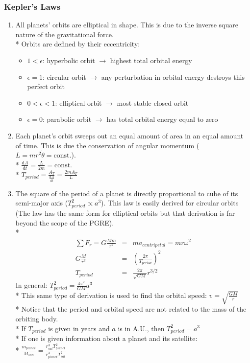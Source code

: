 \subsubsection{Kepler's Laws}
\begin{enumerate}
\item All planets' orbits are elliptical in shape. This is due to the inverse square nature of the gravitational force.\\*
Orbits are defined by their eccentricity:
\begin{itemize}
\item \(1<\epsilon\): hyperbolic orbit \(\to\) highest total orbital energy
\item \(\epsilon =1\): circular orbit \(\to\) any perturbation in orbital energy destroys this perfect orbit
\item  \(0<\epsilon < 1\): elliptical orbit \(\to\) most stable closed orbit
\item \(\epsilon = 0\): parabolic orbit \(\to\) has total orbital energy equal to zero
\end{itemize}
\item Each planet's orbit sweeps out an equal amount of area in an equal amount of time. This is due the conservation of angular momentum (\(L=mr^2\dot{\theta}=\mathrm{const.}\)).\\*
\(\frac{\mathrm{d}A}{\mathrm{d}t}=\frac{L}{2m}=\mathrm{const.}\)\\*
\(T_{period}=\frac{A_T}{\frac{\mathrm{d}A}{\mathrm{d}t}}=\frac{2mA_T}{L}\)
\item The square of the period of a planet is directly proportional to cube of its semi-major axis (\( T_{period}^2 \propto a^3\)). This law is easily derived for circular orbits (The law has the same form for elliptical orbits but that derivation is far beyond the scope of the PGRE).\\*
\begin{eqnarray}
\displaystyle\sum F_r=G\frac{Mm}{r^2}&=&ma_{centripetal}=mr\omega^2 \nonumber \\
G\frac{M}{r^3}&=&\left( \frac{2\pi}{T_{period}} \right)^2 \nonumber \\
T_{period}&=&\frac{2\pi}{\sqrt{GM}}r^{3/2}  \nonumber
\end{eqnarray}
In general: \(\displaystyle T_{period}^2=\frac{4\pi^2}{GM}a^{3}\)\\*
This same type of derivation is used to find the orbital speed: \(v=\sqrt{\frac{GM}{r}}\)\\*
Notice that the period and orbital speed are not related to the mass of the orbiting body.\\*
If \(T_{period}\) is given in years and \(a\) is in A.U., then \(T_{period}^2=a^3\)\\*
If one is given information about a planet and its satellite:\\* \(\displaystyle\frac{m_{planet}}{M_{sun}}=\frac{r_{sat}^3T_{planet}^2}{r_{planet}^3T_{sat}^2}\)
\end{enumerate}

